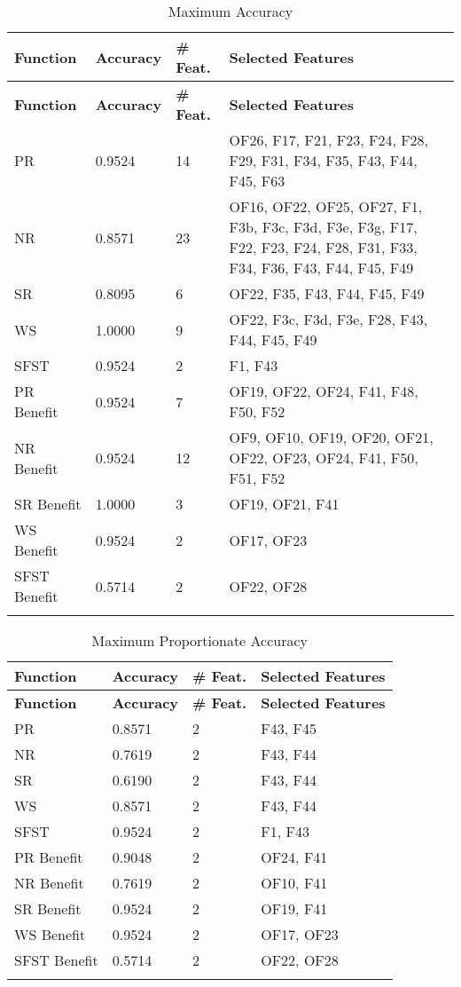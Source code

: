 \begin{longtable}{|p{2cm}|p{2cm}|p{2cm}|p{8cm}|}
\hline
\textbf{Function} & \textbf{Accuracy} & \textbf{\# Feat.} & \textbf{Selected Features} \\ \hline
\endfirsthead
\hline
\textbf{Function} & \textbf{Accuracy} & \textbf{\# Feat.} & \textbf{Selected Features} \\ \hline
\endhead

PR & 0.9524 & 14 & OF26, F17, F21, F23, F24, F28, F29, F31, F34, F35, F43, F44, F45, F63 \\ \hline
NR & 0.8571 & 23 & OF16, OF22, OF25, OF27, F1, F3b, F3c, F3d, F3e, F3g, F17, F22, F23, F24, F28, F31, F33, F34, F36, F43, F44, F45, F49 \\ \hline
SR & 0.8095 & 6 & OF22, F35, F43, F44, F45, F49 \\ \hline
WS & 1.0000 & 9 & OF22, F3c, F3d, F3e, F28, F43, F44, F45, F49 \\ \hline
SFST & 0.9524 & 2 & F1, F43 \\ \hline
PR Benefit & 0.9524 & 7 & OF19, OF22, OF24, F41, F48, F50, F52 \\ \hline
NR Benefit & 0.9524 & 12 & OF9, OF10, OF19, OF20, OF21, OF22, OF23, OF24, F41, F50, F51, F52 \\ \hline
SR Benefit & 1.0000 & 3 & OF19, OF21, F41 \\ \hline
WS Benefit & 0.9524 & 2 & OF17, OF23 \\ \hline
SFST Benefit & 0.5714 & 2 & OF22, OF28 \\ \hline
\caption{Maximum Accuracy}
\label{tab_class_spec:ensemble_class_acc}
\end{longtable}

\begin{longtable}{|p{3cm}|p{2cm}|p{2cm}|p{8cm}|}
\hline
\textbf{Function} & \textbf{Accuracy} & \textbf{\# Feat.} & \textbf{Selected Features} \\ \hline
\endfirsthead
\hline
\textbf{Function} & \textbf{Accuracy} & \textbf{\# Feat.} & \textbf{Selected Features} \\ \hline
\endhead

PR & 0.8571 & 2 & F43, F45 \\ \hline
NR & 0.7619 & 2 & F43, F44 \\ \hline
SR & 0.6190 & 2 & F43, F44 \\ \hline
WS & 0.8571 & 2 & F43, F44 \\ \hline
SFST & 0.9524 & 2 & F1, F43 \\ \hline
PR Benefit & 0.9048 & 2 & OF24, F41 \\ \hline
NR Benefit & 0.7619 & 2 & OF10, F41 \\ \hline
SR Benefit & 0.9524 & 2 & OF19, F41 \\ \hline
WS Benefit & 0.9524 & 2 & OF17, OF23 \\ \hline
SFST Benefit & 0.5714 & 2 & OF22, OF28 \\ \hline
\caption{Maximum Proportionate Accuracy}
\label{tab_class_spec:ensemble_prop_class_acc}
\end{longtable}
